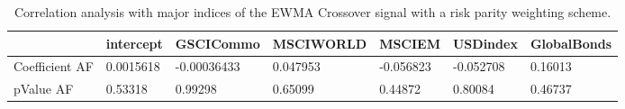 \begin{table}[H]
\centering
\begin{tabular}{lllllll}
\hline& intercept & GSCICommo & MSCIWORLD & MSCIEM & USDindex & GlobalBonds \\ 
\hline 
Coefficient AF & 0.0015618 & -0.00036433 & 0.047953 & -0.056823 & -0.052708 & 0.16013 \\ 
pValue AF & 0.53318 & 0.99298 & 0.65099 & 0.44872 & 0.80084 & 0.46737 \\ 
\hline
\end{tabular}
\caption{Correlation analysis with major indices of the EWMA Crossover signal with a risk parity weighting scheme.}
\label{MBBSRPNR_AFACTOR}
\end{table}